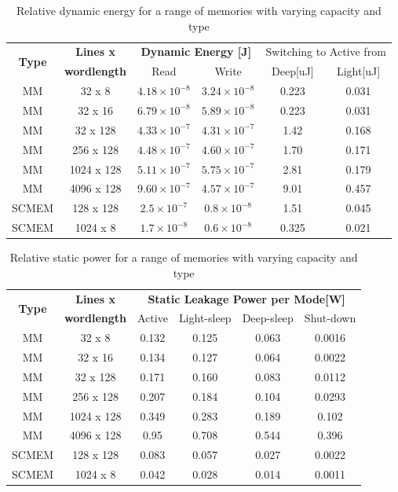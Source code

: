 \begin{table}
	\caption{Relative dynamic energy for a range of memories with varying capacity and type}
	\label{tab:rel1}
	\begin{tabular}{|c|c|c|c|c|c|}
		\hline
		\multirow{2}{*}{\textbf{Type}} & \textbf{Lines x} & \multicolumn{2}{c|}{\textbf{Dynamic Energy [J]}} & \multicolumn{2}{c|}{Switching to Active from} \\ \cline{3-4}
		& \textbf{wordlength} & Read & Write  & Deep[uJ] & Light[uJ]\\ 
		\hline 
		MM & 32 x 8 &  $ 4.18 \times 10^{-8} $ &  $ 3.24 \times 10^{-8} $ & 0.223 &  0.031 \\ 
		\hline
		MM & 32 x 16 & $  6.79 \times 10^{-8} $ &  $ 5.89 \times 10^{-8} $ & 0.223 &  0.031\\ 
		\hline
		MM & 32 x 128 & $  4.33 \times 10^{-7} $ &  $ 4.31 \times 10^{-7} $ & 1.42 & 0.168\\ 
		\hline
		MM & 256 x 128 & $  4.48 \times 10^{-7} $ &  $ 4.60 \times 10^{-7} $ & 1.70 &  0.171\\ 
		\hline
		MM & 1024 x 128 & $  5.11 \times 10^{-7} $ &  $ 5.75 \times 10^{-7} $ & 2.81 & 0.179\\ 
		\hline
		MM & 4096 x 128 & $  9.60 \times 10^{-7} $ &  $ 4.57 \times 10^{-7} $ & 9.01 & 0.457\\ 
		\hline
		SCMEM & 128 x 128 & $  2.5 \times 10^{-7} $ &  $ 0.8 \times 10^{-8} $ & 1.51 &  0.045\\ 
		\hline
		SCMEM & 1024 x 8 & $  1.7 \times 10^{-8} $ &  $ 0.6 \times 10^{-8} $ & 0.325 &  0.021\\ 
		\hline
	\end{tabular}
\end{table}

\begin{table}
	\caption{Relative static power for a range of memories with varying capacity and type}
	\label{tab:rel2}
	\begin{tabular}{|c|c|c|c|c|c|}
		\hline
		\multirow{2}{*}{\textbf{Type}} & \textbf{Lines x} & \multicolumn{4}{c|}{\textbf{Static Leakage Power per Mode[W]}} \\ \cline{3-6}
		& \textbf{wordlength} & Active & Light-sleep & Deep-sleep & Shut-down\\ 
		\hline 
		MM & 32 x 8 & 0.132 & 0.125 & 0.063 & 0.0016\\ 
		\hline
		MM & 32 x 16 & 0.134 & 0.127 & 0.064 & 0.0022\\ 
		\hline
		MM & 32 x 128 & 0.171 & 0.160 & 0.083 & 0.0112\\ 
		\hline
		MM & 256 x 128 & 0.207 & 0.184 & 0.104 & 0.0293\\ 
		\hline
		MM & 1024 x 128 & 0.349 & 0.283 & 0.189 & 0.102\\ 
		\hline
		MM & 4096 x 128 & 0.95 & 0.708 & 0.544 & 0.396\\ 
		\hline
		SCMEM & 128 x 128 & 0.083 & 0.057 & 0.027 & 0.0022\\ 
		\hline
		SCMEM & 1024 x 8 & 0.042 &
		 0.028 & 0.014 & 0.0011\\ 
		\hline
	\end{tabular}
\end{table}

